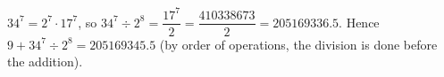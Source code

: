 $34^7=2^7\cdot17^7$, so $34^7\div2^8=\dfrac{17^7}{2}=\dfrac{410338673}{2}=205169336.5$. Hence $9+34^7\div2^8=\boxed{205169345.5}$ (by order of operations, the division is done before the addition).
